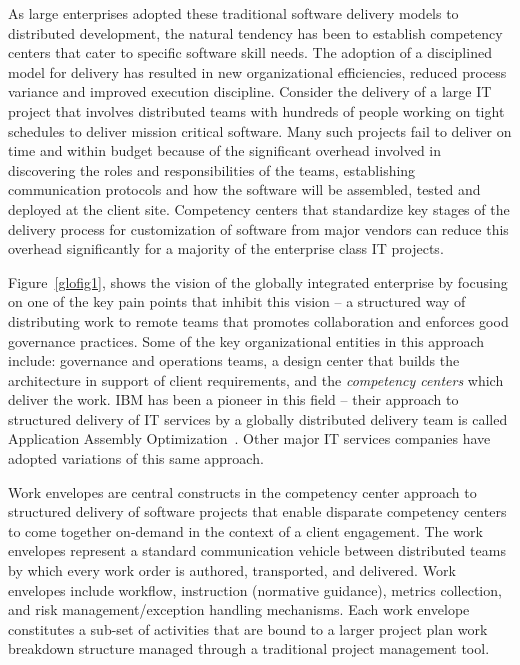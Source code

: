 As large enterprises adopted these traditional software delivery models  to distributed development, the natural tendency has been to establish competency centers that cater to specific software skill needs. The adoption of a disciplined model for delivery has resulted in new organizational efficiencies, reduced process variance and improved execution discipline. Consider the delivery of a large IT project that involves distributed teams with hundreds of people working on tight schedules to deliver mission critical software. Many such projects fail to deliver on time and within budget because of the significant overhead involved in discovering the roles and responsibilities of the teams, establishing communication protocols and how the software will be assembled, tested and deployed at the client site. Competency centers that standardize key stages of the delivery process for customization of software from major vendors can reduce this overhead significantly for a majority of the enterprise class IT projects.

Figure~\ref{glofig1}, shows the vision of the globally integrated enterprise by focusing on one of the key pain points that inhibit this vision -- a structured way of distributing work to remote teams that promotes collaboration and enforces good governance practices.  Some of the key organizational entities in this approach include: governance and operations teams, a design center that builds the architecture in support of client requirements, and the \textit{competency centers} which deliver the work. IBM has been a pioneer in this field -- their approach to structured delivery of IT services by a globally distributed delivery team is called Application Assembly Optimization~\cite{gloaao}. Other major IT services companies have adopted variations of this same approach.

Work envelopes are central constructs in the competency center approach to structured delivery of software projects that enable disparate competency centers to come together on-demand in the context of a client engagement.  The work envelopes represent a standard communication vehicle between distributed teams by which every work order is authored, transported, and delivered. Work envelopes include workflow, instruction (normative guidance), metrics collection, and risk management/exception handling mechanisms. Each work envelope constitutes a sub-set of activities that are bound to a larger project plan work breakdown structure managed through a traditional project management tool.

